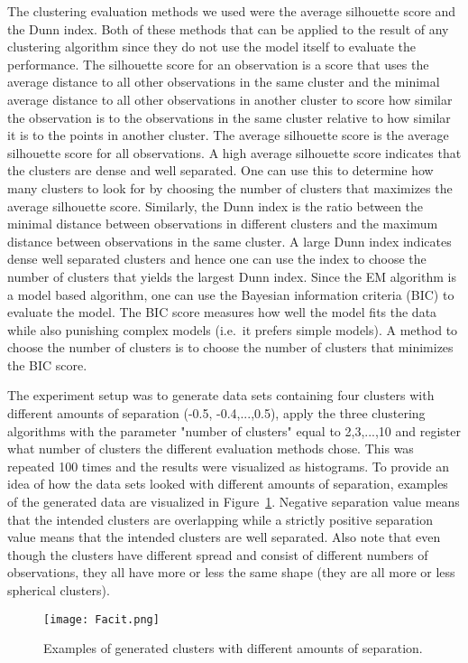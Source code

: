 \documentclass[11pt,twoside,swedish]{article}
\begin{document}
The clustering evaluation methods we used were the average silhouette
score and the Dunn index. Both of these methods that can be applied to
the result of any clustering algorithm since they do not use the model
itself to evaluate the performance. The silhouette score for an
observation is a score that uses the average distance to all other
observations in the same cluster and the minimal average distance to
all other observations in another cluster to score how similar the
observation is to the observations in the same cluster relative to how
similar it is to the points in another cluster. The average silhouette
score is the average silhouette score for all observations. A high
average silhouette score indicates that the clusters are dense and
well separated. One can use this to determine how many clusters to
look for by choosing the number of clusters that maximizes the average
silhouette score. Similarly, the Dunn index is the ratio between the
minimal distance between observations in different clusters and the maximum
distance between observations in the same cluster. A large Dunn index
indicates dense well separated clusters and hence one can use the
index to choose the number of clusters that yields the largest Dunn
index. Since the EM algorithm is a model based algorithm, one can use
the Bayesian information criteria (BIC) to evaluate the model. The BIC
score measures how well the model fits the data while also punishing
complex models (i.e.\ it prefers simple models). A method to choose
the number of clusters is to choose the number of clusters that
minimizes the BIC score.

The experiment setup was to generate data sets containing four
clusters with different amounts of separation (-0.5, -0.4,...,0.5),
apply the three clustering algorithms with the parameter "number of
clusters" equal to 2,3,...,10 and register what number of clusters the
different evaluation methods chose. This was repeated 100 times and
the results were visualized as histograms. To provide an idea of how
the data sets looked with different amounts of separation, examples of
the generated data are visualized in Figure~\ref{facit}. Negative
separation value means that the intended clusters are overlapping
while a strictly positive separation value means that the intended
clusters are well separated. Also note that even though the clusters
have different spread and consist of different numbers of
observations, they all have more or less the same shape (they are all
more or less spherical clusters).

\graphicspath{{/home/mikael/Repos/Courses/msa220/Mini/Mini/Mini_1/}}
\begin{figure}[!h]
\begin{center}
\texttt{[image: Facit.png]}
\caption{Examples of generated clusters with different amounts of separation.}
\label{facit}
\end{center}
\end{figure}
\end{document}
